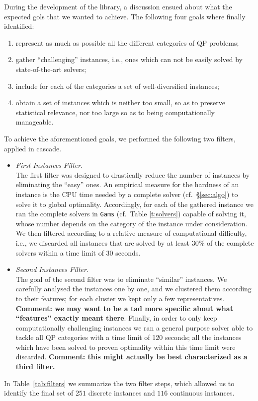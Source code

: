 During the development of the library, a discussion ensued about what
the expected gols that we wanted to achieve. The following four goals
where finally identified:
%
\begin{enumerate}
 \item represent as much as possible all the different categories of QP
       problems;
 \item gather ``challenging'' instances, i.e., ones which can not be easily
       solved by  state-of-the-art solvers;
 \item include for each of the categories a set of well-diversified
       instances;
 \item obtain a set of instances which is neither too small, so as to
       preserve statistical relevance, nor too large so as to being
       computationally manageable.
\end{enumerate}
%
To achieve the aforementioned goals, we performed the following two
filters, applied in cascade.
%
\begin{itemize}
 \item \emph{First Instances Filter.}\\
       The first filter was designed to drastically reduce the number of
       instances by eliminating the ``easy'' ones. An empirical measure
       for the hardness of an instance is the CPU time needed by a
       complete solver (cf.~\S \ref{sec:algo}) to solve it to
       global optimality. Accordingly, for each of the gathered instance we
       ran the complete solvers in {\tt Gams} (cf.~Table \ref{t:solvers})
       capable of solving it, whose number depends on the category of the
       instance under consideration. We then filtered according to a relative
       measure of computational difficulty, i.e., we discarded all instances
       that are solved by at least 30\% of the complete solvers within a time
       limit of 30 seconds.
 \item \emph{Second Instances Filter.}\\
       The goal of the second filter was to eliminate ``similar'' instances.
       We carefully analysed the instances one by one, and we clustered them
       according to their features; for each cluster we kept only a few
       representatives. {\bf Comment: we may want to be a tad more specific
       about what ``features'' exactly meant there}. Finally, in order to only
       keep computationally challenging instances we ran a general purpose solver
       able to tackle all QP categories with a time limit of 120 seconds; all the
       instances which have been solved to proven optimality within this time limit
       were discarded. {\bf Comment: this might actually be best characterized as
       a third filter.}
\end{itemize}
%
In Table~\ref{tab:filters} we summarize the two filter steps, which
allowed us to identify the final set of $251$ discrete instances and
$116$ continuous instances.

